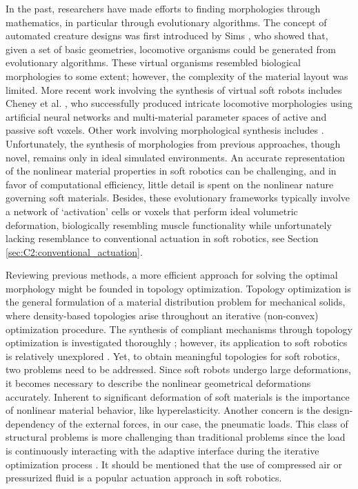 In the past, researchers have made efforts to finding morphologies through mathematics, in particular through evolutionary algorithms. The concept of automated creature designs was first introduced by Sims \cite{Sims1994}, who showed that, given a set of basic geometries, locomotive organisms could be generated from evolutionary algorithms. These virtual organisms resembled biological morphologies to some extent; however, the complexity of the material layout was limited. More recent work involving the synthesis of virtual soft robots includes Cheney et al. \cite{Cheney2013}, who successfully produced intricate locomotive morphologies using artificial neural networks and multi-material parameter spaces of active and passive soft voxels. Other work involving morphological synthesis includes \cite{Bern2019, Morzadec2019Apr,Diepen2019}. Unfortunately, the synthesis of morphologies from previous approaches, though novel, remains only in ideal simulated environments. An accurate representation of the nonlinear material properties in soft robotics can be challenging, and in favor of computational efficiency, little detail is spent on the nonlinear nature governing soft materials. Besides, these evolutionary frameworks typically involve a network of `activation' cells or voxels that perform ideal volumetric deformation, biologically resembling muscle functionality while unfortunately lacking resemblance to conventional actuation in soft robotics, see Section \ref{sec:C2:conventional_actuation}.

Reviewing previous methods, a more efficient approach for solving the optimal morphology might be founded in topology optimization. Topology optimization is the general formulation of a material distribution problem for mechanical solids, where density-based topologies arise throughout an iterative (non-convex) optimization procedure. The synthesis of compliant mechanisms through topology optimization is investigated thoroughly \cite{Bendsoe2003, Gain2013Dec, Luo2016Mar}; however, its application to soft robotics is relatively unexplored \cite{Zhang2017Topo,Zolfagharian2020Jun,Yuhn2023Feb}. Yet, to obtain meaningful topologies for soft robotics, two problems need to be addressed. Since soft robots undergo large deformations, it becomes necessary to describe the nonlinear geometrical deformations accurately. Inherent to significant deformation of soft materials is the importance of nonlinear material behavior, like hyperelasticity. Another concern is the design-dependency of the external forces, in our case, the pneumatic loads. This class of structural problems is more challenging than traditional problems since the load is continuously interacting with the adaptive interface during the iterative optimization process \cite{Wang2016, Vasista2013Jul}. It should be mentioned that the use of compressed air or pressurized fluid is a popular actuation approach in soft robotics.


